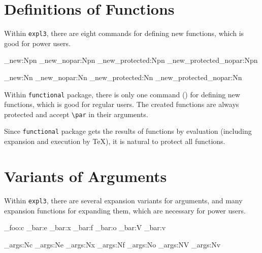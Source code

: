 \documentclass[oneside]{book}
\begin{document}
\section{Definitions of Functions}

Within \verb!expl3!, there are eight commands for defining new functions,
which is good for power users.

\begin{minipage}{0.5\textwidth}
\begin{code}[language=latex/latex3]
\cs_new:Npn
\cs_new_nopar:Npn
\cs_new_protected:Npn
\cs_new_protected_nopar:Npn
\end{code}
\end{minipage}%
\begin{minipage}{0.5\textwidth}
\begin{code}[language=latex/latex3]
\cs_new:Nn
\cs_new_nopar:Nn
\cs_new_protected:Nn
\cs_new_protected_nopar:Nn
\end{code}
\end{minipage}

Within \verb!functional! package, there is only one command ()
for defining new functions, which is good for regular users.
The created functions are always protected and accept \verb!\par! in their arguments.

Since \verb!functional! package gets the results of functions by evaluation
(including expansion and execution by \TeX), it is natural to protect all functions.

\section{Variants of Arguments}

Within \verb!expl3!, there are several expansion variants for arguments,
and many expansion functions for expanding them, which are necessary for power users.

\begin{minipage}{0.5\textwidth}
\begin{code}[language=latex/latex3]
\module_foo:c
\module_bar:e
\module_bar:x
\module_bar:f
\module_bar:o
\module_bar:V
\module_bar:v
\end{code}
\end{minipage}%
\begin{minipage}{0.5\textwidth}
\begin{code}[language=latex/latex3]
\exp_args:Nc
\exp_args:Ne
\exp_args:Nx
\exp_args:Nf
\exp_args:No
\exp_args:NV
\exp_args:Nv
\end{code}
\end{minipage}
\end{document}
